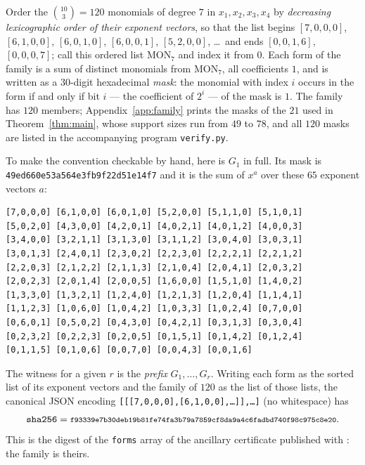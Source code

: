 \documentclass[11pt]{amsart}
\theoremstyle{remark}
\begin{document}
Order the $\binom{10}{3}=120$ monomials of degree $7$ in $x_1,x_2,x_3,x_4$ by
\emph{decreasing lexicographic order of their exponent vectors}, so that the
list begins $[7,0,0,0]$, $[6,1,0,0]$, $[6,0,1,0]$, $[6,0,0,1]$, $[5,2,0,0]$,
\dots\ and ends $[0,0,1,6]$, $[0,0,0,7]$; call this ordered list
$\mathrm{MON}_7$ and index it from $0$. Each form of the family is a sum of
distinct monomials from $\mathrm{MON}_7$, all coefficients $1$, and is written as
a $30$-digit hexadecimal \emph{mask}: the monomial with index $i$ occurs in the
form if and only if bit $i$ --- the coefficient of $2^i$ --- of the mask is $1$.
The family has $120$ members; Appendix~\ref{app:family} prints the masks of the
$21$ used in Theorem~\ref{thm:main}, whose support sizes run from $49$ to $78$,
and all $120$ masks are listed in the accompanying program \texttt{verify.py}.

To make the convention checkable by hand, here is $G_1$ in full. Its mask is
\texttt{49ed660e53a564e3fb9f22d51e14f7} and it is the sum of $x^a$ over these $65$ exponent
vectors $a$:

\begin{center}\footnotesize\begin{verbatim}
[7,0,0,0] [6,1,0,0] [6,0,1,0] [5,2,0,0] [5,1,1,0] [5,1,0,1]
[5,0,2,0] [4,3,0,0] [4,2,0,1] [4,0,2,1] [4,0,1,2] [4,0,0,3]
[3,4,0,0] [3,2,1,1] [3,1,3,0] [3,1,1,2] [3,0,4,0] [3,0,3,1]
[3,0,1,3] [2,4,0,1] [2,3,0,2] [2,2,3,0] [2,2,2,1] [2,2,1,2]
[2,2,0,3] [2,1,2,2] [2,1,1,3] [2,1,0,4] [2,0,4,1] [2,0,3,2]
[2,0,2,3] [2,0,1,4] [2,0,0,5] [1,6,0,0] [1,5,1,0] [1,4,0,2]
[1,3,3,0] [1,3,2,1] [1,2,4,0] [1,2,1,3] [1,2,0,4] [1,1,4,1]
[1,1,2,3] [1,0,6,0] [1,0,4,2] [1,0,3,3] [1,0,2,4] [0,7,0,0]
[0,6,0,1] [0,5,0,2] [0,4,3,0] [0,4,2,1] [0,3,1,3] [0,3,0,4]
[0,2,3,2] [0,2,2,3] [0,2,0,5] [0,1,5,1] [0,1,4,2] [0,1,2,4]
[0,1,1,5] [0,1,0,6] [0,0,7,0] [0,0,4,3] [0,0,1,6]
\end{verbatim}\end{center}

The witness for a given $r$ is the \emph{prefix} $G_1,\dots,G_r$. Writing each
form as the sorted list of its exponent vectors and the family of $120$ as the
list of those lists, the canonical JSON encoding
\texttt{[[[7,0,0,0],[6,1,0,0],\dots]],\dots]} (no whitespace) has
\[
  \text{\texttt{sha256}} =
  \text{\footnotesize\texttt{f93339e7b30deb19b81fe74fa3b79a7859cf8da9a4c6fadbd740f98c975c8e20}}.
\]
This is the digest of the \texttt{forms} array of the ancillary certificate
published with \cite{WZ}: the family is theirs.
\end{document}
